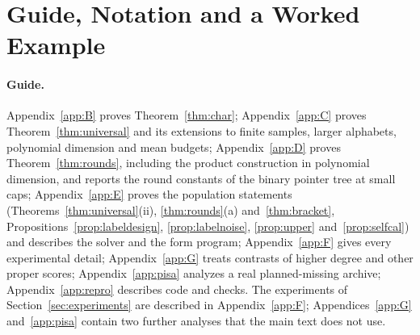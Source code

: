 \section{Guide, Notation and a Worked Example}\label{app:notation}
\paragraph{Guide.}
Appendix~\ref{app:B} proves Theorem~\ref{thm:char}; Appendix~\ref{app:C} proves Theorem~\ref{thm:universal} and its extensions to finite samples, larger alphabets, polynomial dimension and mean budgets; Appendix~\ref{app:D} proves Theorem~\ref{thm:rounds}, including the product construction in polynomial dimension, and reports the round constants of the binary pointer tree at small caps; Appendix~\ref{app:E} proves the population statements (Theorems~\ref{thm:universal}(ii), \ref{thm:rounds}(a) and~\ref{thm:bracket}, Propositions~\ref{prop:labeldesign}, \ref{prop:labelnoise}, \ref{prop:upper} and~\ref{prop:selfcal}) and describes the solver and the form program; Appendix~\ref{app:F} gives every experimental detail; Appendix~\ref{app:G} treats contrasts of higher degree and other proper scores; Appendix~\ref{app:pisa} analyzes a real planned-missing archive; Appendix~\ref{app:repro} describes code and checks. The experiments of Section~\ref{sec:experiments} are described in Appendix~\ref{app:F}; Appendices~\ref{app:G} and~\ref{app:pisa} contain two further analyses that the main text does not use.

